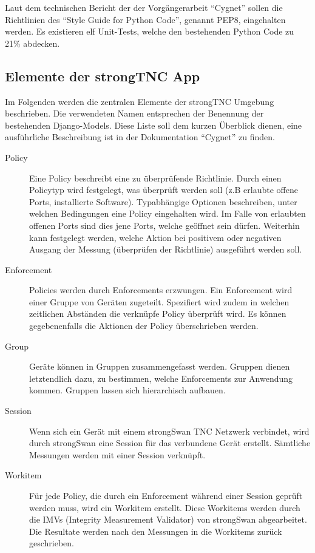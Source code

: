 Laut dem technischen Bericht der der Vorgängerarbeit
\enquote{Cygnet}\cite{cygnet:2013} sollen die Richtlinien des \enquote{Style
Guide for Python Code}\cite{PEP8:2001}, genannt PEP8, eingehalten werden. Es
existieren elf Unit-Tests, welche den bestehenden Python Code zu 21\% abdecken.

\subsection{Elemente der strongTNC App} Im Folgenden werden die zentralen
Elemente der strongTNC Umgebung beschrieben. Die verwendeten Namen entsprechen
der Benennung der bestehenden Django-Models. Diese Liste soll dem kurzen Überblick dienen,
eine ausführliche Beschreibung ist in der Dokumentation
\enquote{Cygnet}\cite{cygnet:2013} zu finden.
\begin{description}
	\item[Policy] Eine Policy beschreibt eine zu überprüfende Richtlinie. Durch einen Policytyp wird
	festgelegt, was überprüft werden soll (z.B erlaubte offene Ports, installierte Software).
	Typabhängige Optionen beschreiben, unter welchen Bedingungen eine Policy eingehalten wird.
	Im Falle von erlaubten offenen Ports sind dies jene Ports, welche geöffnet sein dürfen.
	Weiterhin kann festgelegt werden, welche Aktion bei positivem oder negativen Ausgang der
	Messung (überprüfen der Richtlinie) ausgeführt werden soll.
	
	\item[Enforcement] Policies werden durch Enforcements erzwungen. 
	Ein Enforcement wird einer Gruppe von Geräten zugeteilt. Spezifiert wird zudem in welchen zeitlichen
	Abständen die verknüpfe Policy überprüft wird. Es können gegebenenfalls
	die Aktionen der Policy überschrieben werden.
	
	\item[Group] Geräte können in Gruppen zusammengefasst werden. Gruppen
	dienen letztendlich dazu, zu bestimmen, welche Enforcements zur Anwendung
	kommen. Gruppen lassen sich hierarchisch aufbauen.
		
	\item[Session] Wenn sich ein Gerät mit einem strongSwan TNC Netzwerk verbindet,
	wird durch strongSwan eine Session für das verbundene Gerät erstellt. Sämtliche
	Messungen werden mit einer Session verknüpft.
	
	\item[Workitem] Für jede Policy, die durch ein Enforcement während einer Session
	geprüft werden muss, wird ein Workitem erstellt. Diese Workitems werden durch
	die IMVs (Integrity Measurement Validator) von strongSwan abgearbeitet. Die
	Resultate werden nach den Messungen in die Workitems zurück geschrieben.
	

\end{description}

